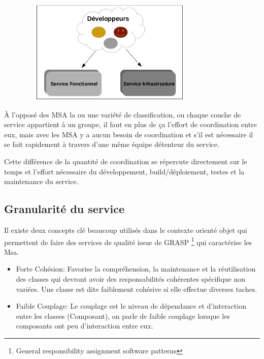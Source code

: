 \documentclass[12pt, a4paper, openany]{report}
\begin{document}
   \begin{center}
     \includegraphics[width=11cm, height=5cm]{detenteur_service_msa_6.png}
     \label{fig6}
   \end{center}
   
   À l'opposé des MSA la ou une variété de classification, ou chaque couche de service appartient à un groupe, il faut en plus de ça l'effort de coordination entre eux, mais avec les MSA y a aucun besoin de coordination et s'il est nécessaire il se fait rapidement à travers d'une même équipe détenteur du service.
   
   Cette différence de la quantité de coordination se répercute directement sur le temps et l'effort nécessaire du développement, build/déploiement, testes et la maintenance du service.
   
   \subsection{Granularité du service}
   Il existe deux concepts clé beaucoup utilisés dans le contexte orienté objet qui permettent de faire des services de qualité issue de GRASP \footnote{General responsibility assignment software patterns} qui caractérise les Msa.
   \begin{itemize}
      \item Forte Cohésion: Favorise la compréhension, la maintenance et la réutilisation des classes qui devront avoir des responsabilités cohérentes spécifique non variées. Une classe est dite faiblement cohésive si elle effectue diverses taches.\cite{refbib5}
      \item Faible Couplage: Le couplage est le niveau de dépendance et d’interaction entre les classes (Composant), on parle de faible couplage lorsque les composants ont peu d’interaction entre eux.\cite{refbib5}
  \end{itemize}
  
\end{document}
